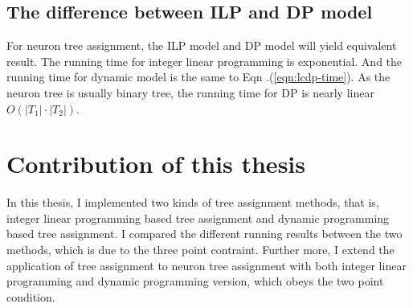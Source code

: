 \subsection{The difference between ILP and DP model}
For neuron tree assignment, the ILP model and DP model will yield equivalent result. The running time for integer linear programming is exponential. And the running time for dynamic model is the same to Eqn .(\ref{eqn:lcdp-time}). As the neuron tree is usually binary tree, the running time for DP is nearly linear $O(|T_1|\cdot|T_2|)$.

\section{Contribution of this thesis}
In this thesis, I implemented two kinds of tree assignment methods, that is, integer linear programming based tree assignment and dynamic programming based tree assignment. I compared the different running results between the two methods, which is due to the three point contraint. Further more, I extend the application of tree assignment to neuron tree assignment with both integer linear programming and dynamic programming version, which obeys the two point condition.
